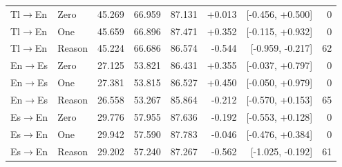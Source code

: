 \begin{table}[t]
\begin{tabular}{llrrrrrr}
Tl$\to$En & Zero & 45.269 & 66.959 & 87.131 & +0.013 & [-0.456, +0.500] & 0 \\
Tl$\to$En & One & 45.659 & 66.896 & 87.471 & +0.352 & [-0.115, +0.932] & 0 \\
Tl$\to$En & Reason & 45.224 & 66.686 & 86.574 & -0.544 & [-0.959, -0.217] & 62 \\
En$\to$Es & Zero & 27.125 & 53.821 & 86.431 & +0.355 & [-0.037, +0.797] & 0 \\
En$\to$Es & One & 27.381 & 53.815 & 86.527 & +0.450 & [-0.050, +0.979] & 0 \\
En$\to$Es & Reason & 26.558 & 53.267 & 85.864 & -0.212 & [-0.570, +0.153] & 65 \\
Es$\to$En & Zero & 29.776 & 57.955 & 87.636 & -0.192 & [-0.553, +0.128] & 0 \\
Es$\to$En & One & 29.942 & 57.590 & 87.783 & -0.046 & [-0.476, +0.384] & 0 \\
Es$\to$En & Reason & 29.202 & 57.240 & 87.267 & -0.562 & [-1.025, -0.192] & 61 \\
\bottomrule
\end{tabular}
\end{table}
